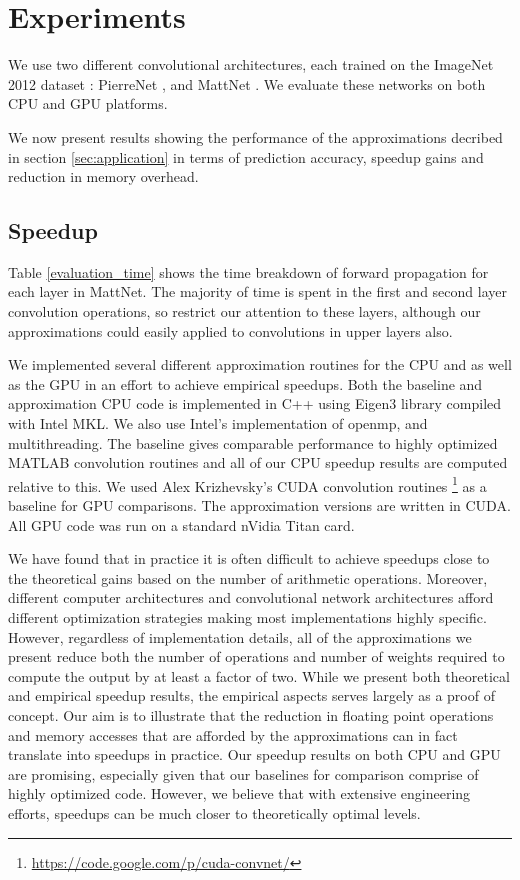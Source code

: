 \section{Experiments}\label{sec:experiments}

We use two different convolutional architectures, each trained on the
ImageNet 2012 dataset \cite{imagenet}: PierreNet \cite{sermanet2013overfeat}, and MattNet \cite{zeiler2013visualizing}. 
We evaluate these networks on both CPU and GPU platforms. 

We now present results showing the performance of the approximations decribed in section \ref{sec:application} in terms of prediction accuracy, speedup gains and reduction in memory overhead. 

\vspace{-0.3cm}
\subsection{Speedup}
Table \ref{evaluation_time} shows the time breakdown of forward
propagation for each layer in MattNet. The majority of time is spent
in the first and second layer convolution operations, so restrict our
attention to these layers, although our approximations could easily
applied to convolutions in upper layers also.

We implemented several different approximation routines for the CPU
and as well as the GPU in an effort to achieve empirical
speedups. Both the baseline and approximation CPU code is implemented
in C++ using Eigen3 library \cite{eigenweb} compiled with Intel MKL.
We also use Intel's implementation of openmp, and multithreading. The
baseline gives comparable performance to highly optimized MATLAB
convolution routines and all of our CPU speedup results are computed
relative to this.  We used Alex Krizhevsky's CUDA convolution routines
\footnote{\url{https://code.google.com/p/cuda-convnet/}} as a baseline for GPU
comparisons. The approximation versions are written in CUDA. All GPU
code was run on a standard nVidia Titan card.

We have found that in practice it is often difficult to achieve
speedups close to the theoretical gains based on the number of
arithmetic operations.
Moreover, different computer architectures and convolutional network
architectures afford different optimization strategies making most
implementations highly specific.  However, regardless of
implementation details, all of the approximations we present reduce
both the number of operations and number of weights required to
compute the output by at least a factor of two.  While we present both
theoretical and empirical speedup results, the empirical aspects
serves largely as a proof of concept. Our aim is to illustrate that
the reduction in floating point operations and memory accesses that
are afforded by the approximations can in fact translate into speedups
in practice.  Our speedup results on both CPU and GPU are promising,
especially given that our baselines for comparison comprise of highly
optimized code. However, we believe that with extensive engineering
efforts, speedups can be much closer to theoretically optimal levels.

